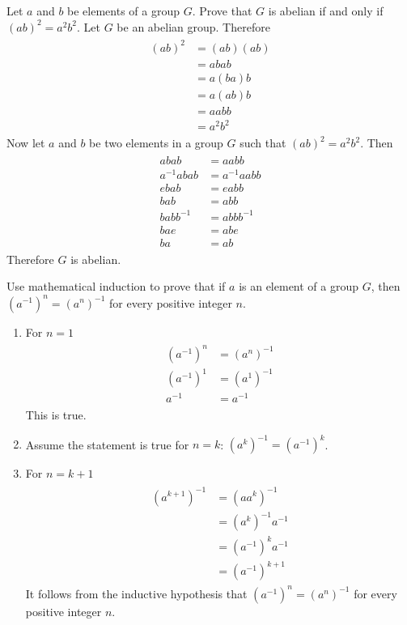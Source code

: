 \documentclass[paper=a4, fontsize=11pt]{jhwhw} %
\begin{document}
Let $a$ and $b$ be elements of a group $G$. Prove that $G$ is abelian if and only if $(ab)^2 = a^2b^2$.
\solution
Let $G$ be an abelian group. Therefore
\begin{align}
\begin{split}
(ab)^2 &= (ab)(ab)\\
&= abab\\
&= a(ba)b\\
&=a(ab)b\\
&=aabb\\
&=a^2b^2
\end{split}
\end{align}
Now let $a$ and $b$ be two elements in a group $G$ such that $(ab)^2 = a^2b^2$.  Then
\begin{align}
\begin{split}
abab&= aabb\\
a^{-1}abab &= a^{-1}aabb\\
ebab &= eabb\\
bab &= abb\\
babb^{-1} &= abbb^{-1}\\
bae &= abe\\
ba &= ab
\end{split}
\end{align}
Therefore $G$ is abelian. 

Use mathematical induction to prove that if $a$ is an element of a group $G$, then $(a^{-1})^n = (a^n)^{-1}$ for every positive integer $n$.
\solution
\begin{enumerate}
\item For $n=1$
\begin{align}
\begin{split}
(a^{-1})^n &= (a^n)^{-1}\\
(a^{-1})^1 &= (a^1)^{-1}\\
a^{-1} &= a^{-1}
\end{split}
\end{align}
This is true.
\item
Assume the statement is true for $n=k$: $(a^k)^{-1} = (a^{-1})^k$.
\item
For $n=k+1$
\begin{align}
\begin{split}
(a^{k+1})^{-1} &= (aa^{k})^{-1}\\
&= (a^k)^{-1}a^{-1}\\
&= (a^{-1})^ka^{-1}\\
&= (a^{-1})^{k+1}
\end{split}
\end{align}
It follows from the inductive hypothesis that $(a^{-1})^n = (a^n)^{-1}$ for every positive integer $n$.
\end{enumerate}
\end{document}
